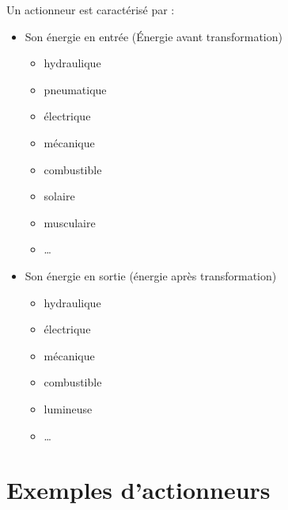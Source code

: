 \documentclass[10pt,fleqn]{article} %
\begin{document}
Un actionneur est caractérisé par :
\begin{itemize}
  \item Son énergie en entrée (Énergie avant transformation)
  \begin{itemize}
    \item hydraulique
    \item pneumatique
    \item électrique
    \item mécanique
    \item combustible
    \item solaire
    \item musculaire
    \item \dots
  \end{itemize}
  \item Son énergie en sortie (énergie après transformation)
  \begin{itemize}
    \item hydraulique
    \item électrique
    \item mécanique
    \item combustible
    \item lumineuse
    \item \dots
  \end{itemize}



\end{itemize}
\pagebreak
\section{Exemples d'actionneurs}
\end{document}
